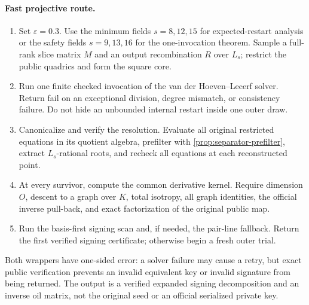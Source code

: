 \documentclass[11pt,a4paper]{article}
\theoremstyle{definition}
\theoremstyle{remark}
\begin{document}
\paragraph{Fast projective route.}
\begin{enumerate}
\item Set $\varepsilon=0.3$.  Use the minimum fields $s=8,12,15$ for expected-restart analysis or the safety fields $s=9,13,16$ for the one-invocation theorem.  Sample a full-rank slice matrix $M$ and an output recombination $R$ over $L_s$; restrict the public quadrics and form the square core.
\item Run one finite checked invocation of the van der Hoeven--Lecerf solver.  Return \textsf{fail} on an exceptional division, degree mismatch, or consistency failure.  Do not hide an unbounded internal restart inside one outer draw.
\item Canonicalize and verify the resolution.  Evaluate all original restricted equations in its quotient algebra, prefilter with \cref{prop:separator-prefilter}, extract $L_s$-rational roots, and recheck all equations at each reconstructed point.
\item At every survivor, compute the common derivative kernel.  Require dimension $O$, descent to a graph over $K$, total isotropy, all graph identities, the official inverse pull-back, and exact factorization of the original public map.
\item Run the basis-first signing scan and, if needed, the pair-line fallback.  Return the first verified signing certificate; otherwise begin a fresh outer trial.
\end{enumerate}

Both wrappers have one-sided error: a solver failure may cause a retry, but exact public verification prevents an invalid equivalent key or invalid signature from being returned.  The output is a verified expanded signing decomposition and an inverse oil matrix, not the original seed or an official serialized private key.
\end{document}
